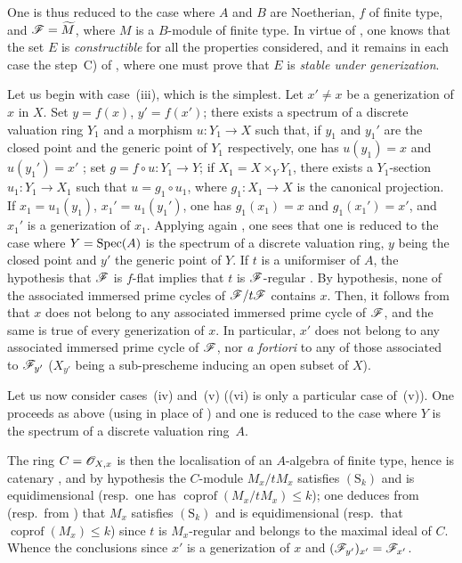 One is thus reduced to the case where $A$ and $B$ are Noetherian, $f$ of finite type, and $\mathscr{F}=\widetilde{M}$, where $M$ is a $B$-module of finite type.
In virtue of , one knows that the set $E$ is \emph{constructible} for all the properties considered, and it remains in each case the step~C) of , where one must prove that $E$ is \emph{stable under generization}.

\begin{env}[12.1.1.1]
\label{IV.12.1.1.1}
Let us begin with case~(iii), which is the simplest.
Let $x'\neq x$ be a generization of $x$ in $X$.
Set $y=f(x)$, $y'=f(x')$; there exists a spectrum of a discrete valuation ring $Y_1$ and a morphism $u:Y_1\to X$ such that, if $y_1$ and $y_1'$ are the closed point and the generic point of $Y_1$ respectively, one has $u(y_1)=x$ and $u(y_1')=x'$ ; set $g=f\circ u:Y_1\to Y$; if $X_1=X\times_Y Y_1$, there exists a $Y_1$-section $u_1:Y_1\to X_1$ such that $u=g_1\circ u_1$, where $g_1:X_1\to X$ is the canonical projection.
If $x_1=u_1(y_1)$, $x_1'=u_1(y_1')$, one has $g_1(x_1)=x$ and $g_1(x_1')=x'$, and $x_1'$ is a generization of $x_1$.
Applying again , one sees
that one is reduced to the case where $Y=\operatorname{Spec}(A)$ is the spectrum of a discrete valuation ring, $y$ being the closed point and $y'$ the generic point of $Y$.
If $t$ is a uniformiser of $A$, the hypothesis that $\mathscr{F}$ is $f$-flat implies that $t$ is $\mathscr{F}$-regular .
By hypothesis, none of the associated immersed prime cycles of $\mathscr{F}/t\mathscr{F}$ contains $x$.
Then, it follows from  that $x$ does not belong to any associated immersed prime cycle of $\mathscr{F}$, and the same is true of every generization of $x$.
In particular, $x'$ does not belong to any associated immersed prime cycle of $\mathscr{F}$, nor \emph{a fortiori} to any of those associated to $\mathscr{F}_{y'}$ ($X_{y'}$ being a sub-prescheme inducing an open subset of $X$).
\end{env}

\begin{env}[12.1.1.2]
\label{IV.12.1.1.2}
Let us now consider cases~(iv) and~(v) ((vi) is only a particular case of~(v)).
One proceeds as above (using  in place of ) and one is reduced to the case where $Y$ is the spectrum of a discrete valuation ring~$A$.

The ring $C=\mathscr{O}_{X,x}$ is then the localisation of an $A$-algebra of finite type, hence is catenary , and by hypothesis the $C$-module $M_x/tM_x$ satisfies $(\mathrm{S}_k)$ and is equidimensional (resp.\ one has $\operatorname{coprof}(M_x/tM_x)\leqslant k$); one deduces from  (resp.\ from ) that $M_x$ satisfies $(\mathrm{S}_k)$ and is equidimensional (resp.\ that $\operatorname{coprof}(M_x)\leqslant k$) since $t$ is $M_x$-regular and belongs to the maximal ideal of $C$.
Whence the conclusions since $x'$ is a generization of $x$ and $(\mathscr{F}_{y'})_{x'}=\mathscr{F}_{x'}$.
\end{env}

